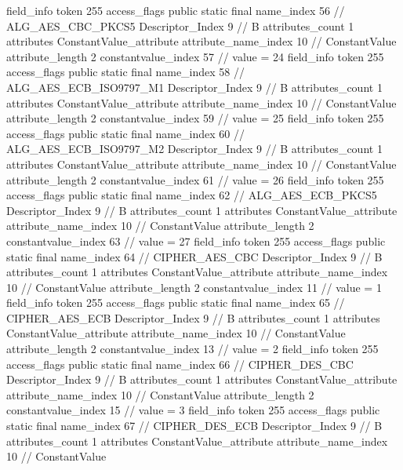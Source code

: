 {{{{{{{				}
				}
			}
			field_info {
				token	255
				access_flags	public static final
				name_index	56		// ALG_AES_CBC_PKCS5
				Descriptor_Index	9		// B
				attributes_count	1
				attributes {
				ConstantValue_attribute {
					attribute_name_index	10		// ConstantValue
					attribute_length	2
					constantvalue_index	57		// value = 24
				}
				}
			}
			field_info {
				token	255
				access_flags	public static final
				name_index	58		// ALG_AES_ECB_ISO9797_M1
				Descriptor_Index	9		// B
				attributes_count	1
				attributes {
				ConstantValue_attribute {
					attribute_name_index	10		// ConstantValue
					attribute_length	2
					constantvalue_index	59		// value = 25
				}
				}
			}
			field_info {
				token	255
				access_flags	public static final
				name_index	60		// ALG_AES_ECB_ISO9797_M2
				Descriptor_Index	9		// B
				attributes_count	1
				attributes {
				ConstantValue_attribute {
					attribute_name_index	10		// ConstantValue
					attribute_length	2
					constantvalue_index	61		// value = 26
				}
				}
			}
			field_info {
				token	255
				access_flags	public static final
				name_index	62		// ALG_AES_ECB_PKCS5
				Descriptor_Index	9		// B
				attributes_count	1
				attributes {
				ConstantValue_attribute {
					attribute_name_index	10		// ConstantValue
					attribute_length	2
					constantvalue_index	63		// value = 27
				}
				}
			}
			field_info {
				token	255
				access_flags	public static final
				name_index	64		// CIPHER_AES_CBC
				Descriptor_Index	9		// B
				attributes_count	1
				attributes {
				ConstantValue_attribute {
					attribute_name_index	10		// ConstantValue
					attribute_length	2
					constantvalue_index	11		// value = 1
				}
				}
			}
			field_info {
				token	255
				access_flags	public static final
				name_index	65		// CIPHER_AES_ECB
				Descriptor_Index	9		// B
				attributes_count	1
				attributes {
				ConstantValue_attribute {
					attribute_name_index	10		// ConstantValue
					attribute_length	2
					constantvalue_index	13		// value = 2
				}
				}
			}
			field_info {
				token	255
				access_flags	public static final
				name_index	66		// CIPHER_DES_CBC
				Descriptor_Index	9		// B
				attributes_count	1
				attributes {
				ConstantValue_attribute {
					attribute_name_index	10		// ConstantValue
					attribute_length	2
					constantvalue_index	15		// value = 3
				}
				}
			}
			field_info {
				token	255
				access_flags	public static final
				name_index	67		// CIPHER_DES_ECB
				Descriptor_Index	9		// B
				attributes_count	1
				attributes {
				ConstantValue_attribute {
					attribute_name_index	10		// ConstantValue
}}}}}}}
